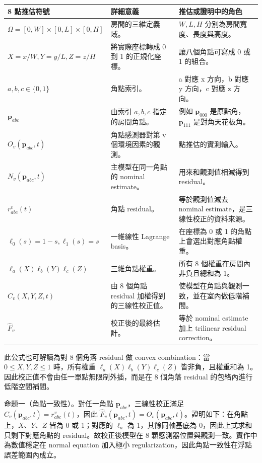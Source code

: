 \documentclass[12pt,a4paper]{article}
\begin{document}
\begin{table}[htbp]
\centering
\footnotesize
\renewcommand{\arraystretch}{1.25}
\begin{tabular}{|>{\raggedright\arraybackslash}p{}|>{\raggedright\arraybackslash}p{}|>{\raggedright\arraybackslash}p{}|}
\hline
\textbf{8 點推估符號} & \textbf{詳細意義} & \textbf{推估或證明中的角色} \\
\hline
$\Omega=[0,W]\times[0,L]\times[0,H]$ & 房間的三維定義域。 & $W,L,H$ 分別為房間寬度、長度與高度。 \\
\hline
$X=x/W,Y=y/L,Z=z/H$ & 將實際座標轉成 0 到 1 的正規化座標。 & 讓八個角點可寫成 0 或 1 的組合。 \\
\hline
$a,b,c\in\{0,1\}$ & 角點索引。 & a 對應 x 方向，b 對應 y 方向，c 對應 z 方向。 \\
\hline
$\mathbf{p}_{abc}$ & 由索引 $a,b,c$ 指定的房間角點。 & 例如 $\mathbf{p}_{000}$ 是原點角，$\mathbf{p}_{111}$ 是對角天花板角。 \\
\hline
$O_v(\mathbf{p}_{abc},t)$ & 角點感測器對第 v 個環境因素的觀測。 & 8 點推估的實測輸入。 \\
\hline
$N_v(\mathbf{p}_{abc},t)$ & 主模型在同一角點的 nominal estimate。 & 用來和觀測值相減得到 residual。 \\
\hline
$r_{abc}^{v}(t)$ & 角點 residual。 & 等於觀測值減去 nominal estimate，是三線性校正的資料來源。 \\
\hline
$\ell_0(s)=1-s,\ell_1(s)=s$ & 一維線性 Lagrange basis。 & 在座標為 0 或 1 的角點上會選出對應角點權重。 \\
\hline
$\ell_a(X)\ell_b(Y)\ell_c(Z)$ & 三維角點權重。 & 所有 8 個權重在房間內非負且總和為 1。 \\
\hline
$C_v(X,Y,Z,t)$ & 由 8 個角點 residual 加權得到的三線性校正值。 & 使模型在角點與觀測一致，並在室內做低階補間。 \\
\hline
$\hat{F}_v$ & 校正後的最終估計。 & 等於 nominal estimate 加上 trilinear residual correction。 \\
\hline
\end{tabular}
\end{table}

此公式也可解讀為對 8 個角落 residual 做 convex combination：當 $0\le X,Y,Z\le1$ 時，所有權重 $\ell_a(X)\ell_b(Y)\ell_c(Z)$ 皆非負，且權重和為 1。因此校正值不會由任一單點無限制外插，而是在 8 個角落 residual 的包絡內進行低階空間補間。


命題一（角點一致性）。對任一角點 $\mathbf{p}_{abc}$，三線性校正滿足 $C_v(\mathbf{p}_{abc},t)=r_{abc}^{v}(t)$，因此 $\hat{F}_v(\mathbf{p}_{abc},t)=O_v(\mathbf{p}_{abc},t)$。證明如下：在角點上，$X$、$Y$、$Z$ 皆為 0 或 1；對應的 $\ell_a$ 為 1，其餘同軸基底為 0，因此上式求和只剩下對應角點的 residual。故校正後模型在 8 顆感測器位置與觀測一致。實作中為數值穩定在 normal equation 加入極小 regularization，因此角點一致性在浮點誤差範圍內成立。
\end{document}
